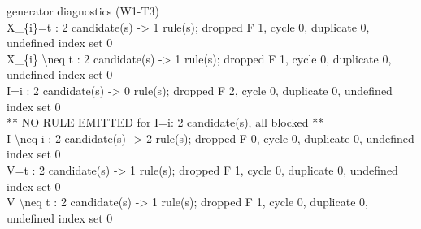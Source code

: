 \documentclass[10pt,a4paper]{article}
\newcommand{\diag}[1]{{\small\itshape\raggedright #1\par}}
\begin{document}
\diag{generator diagnostics (W1-T3)\\{} X\_\{i\}=t : 2 candidate(s) -> 1 rule(s); dropped F 1, cycle 0, duplicate 0, undefined index set 0\\{} X\_\{i\} \textbackslash{}neq t : 2 candidate(s) -> 1 rule(s); dropped F 1, cycle 0, duplicate 0, undefined index set 0\\{} I=i : 2 candidate(s) -> 0 rule(s); dropped F 2, cycle 0, duplicate 0, undefined index set 0\\{}   ** NO RULE EMITTED for I=i: 2 candidate(s), all blocked **\\{} I \textbackslash{}neq i : 2 candidate(s) -> 2 rule(s); dropped F 0, cycle 0, duplicate 0, undefined index set 0\\{} V=t : 2 candidate(s) -> 1 rule(s); dropped F 1, cycle 0, duplicate 0, undefined index set 0\\{} V \textbackslash{}neq t : 2 candidate(s) -> 1 rule(s); dropped F 1, cycle 0, duplicate 0, undefined index set 0}
\end{document}

